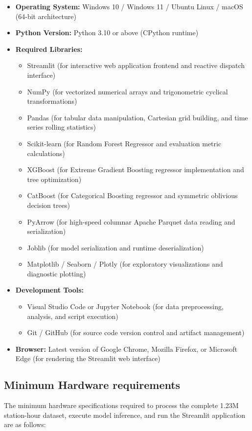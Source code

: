 \documentclass[12pt, a4paper]{article}
\renewcommand{\_}{\textunderscore\allowbreak}
\begin{document}
\begin{itemize}
    \item \textbf{Operating System:} Windows 10 / Windows 11 / Ubuntu Linux / macOS (64-bit architecture)
    \item \textbf{Python Version:} Python 3.10 or above (CPython runtime)
    \item \textbf{Required Libraries:}
    \begin{itemize}
        \item Streamlit (for interactive web application frontend and reactive dispatch interface)
        \item NumPy (for vectorized numerical arrays and trigonometric cyclical transformations)
        \item Pandas (for tabular data manipulation, Cartesian grid building, and time series rolling statistics)
        \item Scikit-learn (for Random Forest Regressor and evaluation metric calculations)
        \item XGBoost (for Extreme Gradient Boosting regressor implementation and tree optimization)
        \item CatBoost (for Categorical Boosting regressor and symmetric oblivious decision trees)
        \item PyArrow (for high-speed columnar Apache Parquet data reading and serialization)
        \item Joblib (for model serialization and runtime deserialization)
        \item Matplotlib / Seaborn / Plotly (for exploratory visualizations and diagnostic plotting)
    \end{itemize}
    \item \textbf{Development Tools:}
    \begin{itemize}
        \item Visual Studio Code or Jupyter Notebook (for data preprocessing, analysis, and script execution)
        \item Git / GitHub (for source code version control and artifact management)
    \end{itemize}
    \item \textbf{Browser:} Latest version of Google Chrome, Mozilla Firefox, or Microsoft Edge (for rendering the Streamlit web interface)
\end{itemize}

\subsection{Minimum Hardware requirements}
The minimum hardware specifications required to process the complete 1.23M station-hour dataset, execute model inference, and run the Streamlit application are as follows:
\end{document}
